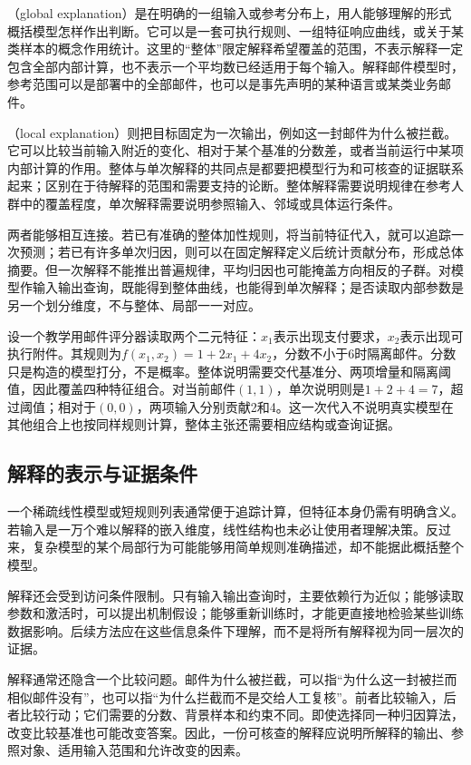 （global explanation）是在明确的一组输入或参考分布上，用人能够理解的形式概括模型怎样作出判断。它可以是一套可执行规则、一组特征响应曲线，或关于某类样本的概念作用统计。这里的“整体”限定解释希望覆盖的范围，不表示解释一定包含全部内部计算，也不表示一个平均数已经适用于每个输入。解释邮件模型时，参考范围可以是部署中的全部邮件，也可以是事先声明的某种语言或某类业务邮件。

（local explanation）则把目标固定为一次输出，例如这一封邮件为什么被拦截。它可以比较当前输入附近的变化、相对于某个基准的分数差，或者当前运行中某项内部计算的作用。整体与单次解释的共同点是都要把模型行为和可核查的证据联系起来；区别在于待解释的范围和需要支持的论断。整体解释需要说明规律在参考人群中的覆盖程度，单次解释需要说明参照输入、邻域或具体运行条件。

两者能够相互连接。若已有准确的整体加性规则，将当前特征代入，就可以追踪一次预测；若已有许多单次归因，则可以在固定解释定义后统计贡献分布，形成总体摘要。但一次解释不能推出普遍规律，平均归因也可能掩盖方向相反的子群。对模型作输入输出查询，既能得到整体曲线，也能得到单次解释；是否读取内部参数是另一个划分维度，不与整体、局部一一对应。

\begin{example}[同一规则的整体与单次说明]
\label{ex:interpretability-global-local}
设一个教学用邮件评分器读取两个二元特征：$x_1$表示出现支付要求，$x_2$表示出现可执行附件。其规则为$f(x_1,x_2)=1+2x_1+4x_2$，分数不小于6时隔离邮件。分数只是构造的模型打分，不是概率。整体说明需要交代基准分、两项增量和隔离阈值，因此覆盖四种特征组合。对当前邮件$(1,1)$，单次说明则是$1+2+4=7$，超过阈值；相对于$(0,0)$，两项输入分别贡献2和4。这一次代入不说明真实模型在其他组合上也按同样规则计算，整体主张还需要相应结构或查询证据。
\end{example}

\subsection{解释的表示与证据条件}

一个稀疏线性模型或短规则列表通常便于追踪计算，但特征本身仍需有明确含义。若输入是一万个难以解释的嵌入维度，线性结构也未必让使用者理解决策。反过来，复杂模型的某个局部行为可能能够用简单规则准确描述，却不能据此概括整个模型。

解释还会受到访问条件限制。只有输入输出查询时，主要依赖行为近似；能够读取参数和激活时，可以提出机制假设；能够重新训练时，才能更直接地检验某些训练数据影响。后续方法应在这些信息条件下理解，而不是将所有解释视为同一层次的证据。

解释通常还隐含一个比较问题。邮件为什么被拦截，可以指“为什么这一封被拦而相似邮件没有”，也可以指“为什么拦截而不是交给人工复核”。前者比较输入，后者比较行动；它们需要的分数、背景样本和约束不同。即使选择同一种归因算法，改变比较基准也可能改变答案。因此，一份可核查的解释应说明所解释的输出、参照对象、适用输入范围和允许改变的因素。

